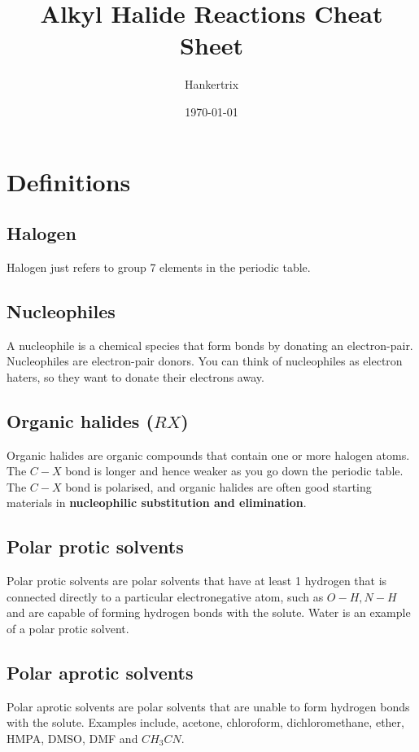 \documentclass[11pt]{article}
\author{Hankertrix}
\date{\today}
\title{Alkyl Halide Reactions Cheat Sheet}
\begin{document}
\maketitle
\setcounter{tocdepth}{2}
\tableofcontents

\newpage

\section{Definitions}
\label{sec:orgf0a3068}

\subsection{Halogen}
\label{sec:org657e4b2}
Halogen just refers to group 7 elements in the periodic table.

\subsection{Nucleophiles}
\label{sec:org04f17ef}
A nucleophile is a chemical species that form bonds by donating an electron-pair. Nucleophiles are electron-pair donors. You can think of nucleophiles as electron haters, so they want to donate their electrons away.

\subsection{Organic halides (\(RX\))}
\label{sec:orgf3bd9c8}
Organic halides are organic compounds that contain one or more halogen atoms. The \(C - X\) bond is longer and hence weaker as you go down the periodic table. The \(C - X\) bond is polarised, and organic halides are often good starting materials in \textbf{nucleophilic substitution and elimination}.

\subsection{Polar protic solvents}
\label{sec:orgc3f1fa5}
Polar protic solvents are polar solvents that have at least 1 hydrogen that is connected directly to a particular electronegative atom, such as \(O-H, N-H\) and are capable of forming hydrogen bonds with the solute. Water is an example of a polar protic solvent.

\subsection{Polar aprotic solvents}
\label{sec:orgae8afa7}
Polar aprotic solvents are polar solvents that are unable to form hydrogen bonds with the solute. Examples include, acetone, chloroform, dichloromethane, ether, HMPA, DMSO, DMF and \(CH_3 CN\).
\end{document}
